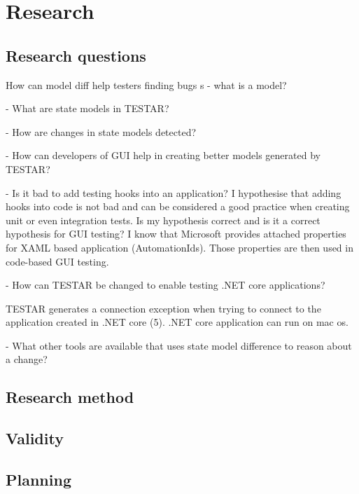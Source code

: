 \section{Research}

\subsection{Research questions}

How can model diff help testers finding bugs
s
- what is a model?

- What are state models in TESTAR?

- How are changes in state models detected?

- How can developers of GUI help in creating better models generated by TESTAR?

- Is it bad to add testing hooks into an application? I hypothesise that adding hooks into code is not bad and can be considered a good practice when creating unit or even integration tests. Is my hypothesis correct and is it a correct hypothesis for GUI testing? I know that Microsoft provides attached properties for XAML based application (AutomationIds). Those properties are then used in code-based GUI testing.


- How can TESTAR be changed to enable testing .NET core applications?

TESTAR generates a connection exception when trying to connect to the application created in .NET core (5). .NET core application can run on mac os. 

- What other tools are available that uses state model difference to reason about a change? 


\subsection{Research method}

\subsection{Validity}

\subsection{Planning}